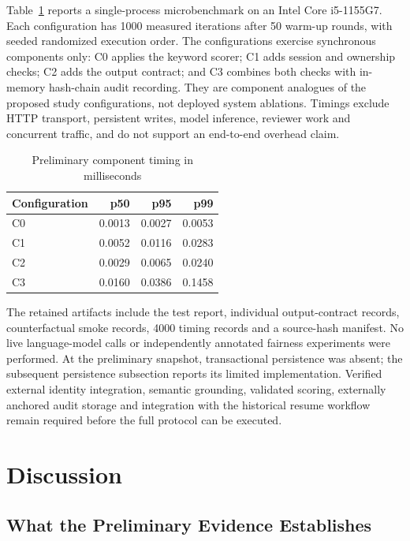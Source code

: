 \documentclass[conference]{IEEEtran}
\begin{document}
Table~\ref{tab:reference_microbenchmark} reports a single-process microbenchmark on an Intel Core i5-1155G7. Each configuration has 1000 measured iterations after 50 warm-up rounds, with seeded randomized execution order. The configurations exercise synchronous components only: C0 applies the keyword scorer; C1 adds session and ownership checks; C2 adds the output contract; and C3 combines both checks with in-memory hash-chain audit recording. They are component analogues of the proposed study configurations, not deployed system ablations. Timings exclude HTTP transport, persistent writes, model inference, reviewer work and concurrent traffic, and do not support an end-to-end overhead claim.

\begin{table}[t]
\caption{Preliminary component timing in milliseconds}
\label{tab:reference_microbenchmark}
\centering
\begin{tabular}{lrrr}
\hline
Configuration & p50 & p95 & p99 \\
\hline
C0 & 0.0013 & 0.0027 & 0.0053 \\
C1 & 0.0052 & 0.0116 & 0.0283 \\
C2 & 0.0029 & 0.0065 & 0.0240 \\
C3 & 0.0160 & 0.0386 & 0.1458 \\
\hline
\end{tabular}
\end{table}

The retained artifacts include the test report, individual output-contract records, counterfactual smoke records, 4000 timing records and a source-hash manifest. No live language-model calls or independently annotated fairness experiments were performed. At the preliminary snapshot, transactional persistence was absent; the subsequent persistence subsection reports its limited implementation. Verified external identity integration, semantic grounding, validated scoring, externally anchored audit storage and integration with the historical resume workflow remain required before the full protocol can be executed.

\section{Discussion}

\subsection{What the Preliminary Evidence Establishes}
\end{document}
